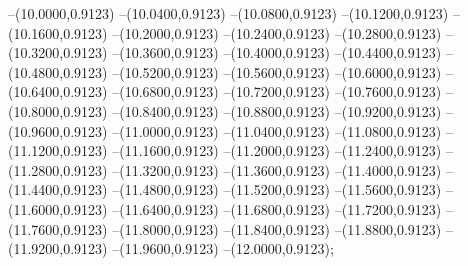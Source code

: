 {	--(10.0000,0.9123)
	--(10.0400,0.9123)
	--(10.0800,0.9123)
	--(10.1200,0.9123)
	--(10.1600,0.9123)
	--(10.2000,0.9123)
	--(10.2400,0.9123)
	--(10.2800,0.9123)
	--(10.3200,0.9123)
	--(10.3600,0.9123)
	--(10.4000,0.9123)
	--(10.4400,0.9123)
	--(10.4800,0.9123)
	--(10.5200,0.9123)
	--(10.5600,0.9123)
	--(10.6000,0.9123)
	--(10.6400,0.9123)
	--(10.6800,0.9123)
	--(10.7200,0.9123)
	--(10.7600,0.9123)
	--(10.8000,0.9123)
	--(10.8400,0.9123)
	--(10.8800,0.9123)
	--(10.9200,0.9123)
	--(10.9600,0.9123)
	--(11.0000,0.9123)
	--(11.0400,0.9123)
	--(11.0800,0.9123)
	--(11.1200,0.9123)
	--(11.1600,0.9123)
	--(11.2000,0.9123)
	--(11.2400,0.9123)
	--(11.2800,0.9123)
	--(11.3200,0.9123)
	--(11.3600,0.9123)
	--(11.4000,0.9123)
	--(11.4400,0.9123)
	--(11.4800,0.9123)
	--(11.5200,0.9123)
	--(11.5600,0.9123)
	--(11.6000,0.9123)
	--(11.6400,0.9123)
	--(11.6800,0.9123)
	--(11.7200,0.9123)
	--(11.7600,0.9123)
	--(11.8000,0.9123)
	--(11.8400,0.9123)
	--(11.8800,0.9123)
	--(11.9200,0.9123)
	--(11.9600,0.9123)
	--(12.0000,0.9123);
}
